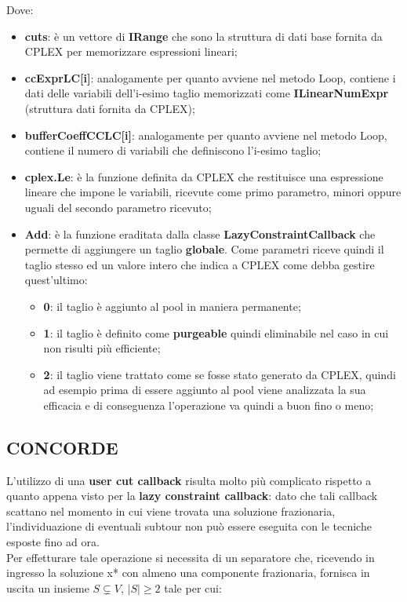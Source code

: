 \documentclass[11pt]{article}
\begin{document}
Dove:

\begin{itemize}
    \item \textbf{cuts}: è un vettore di \textbf{IRange} che sono la struttura di dati base fornita da CPLEX per memorizzare espressioni lineari;
    \item \textbf{ccExprLC[i]}: analogamente per quanto avviene nel metodo Loop, contiene i dati delle variabili dell'i-esimo taglio memorizzati come \textbf{ILinearNumExpr} (struttura dati fornita da CPLEX);
    \item \textbf{bufferCoeffCCLC[i]}: analogamente per quanto avviene nel metodo Loop, contiene il numero di variabili che definiscono l'i-esimo taglio;
    \item \textbf{cplex.Le}: è la funzione definita da CPLEX che restituisce una espressione lineare che impone le variabili, ricevute come primo parametro, minori oppure uguali del secondo parametro ricevuto;
    \item \textbf{Add}: è la funzione eraditata dalla classe \textbf{LazyConstraintCallback} che permette di aggiungere un taglio \textbf{globale}. Come parametri riceve quindi il taglio stesso ed un valore intero che indica a CPLEX come debba gestire quest'ultimo:
    \begin{itemize}
        \item \textbf{0}: il taglio è aggiunto al pool in maniera permanente;
        \item \textbf{1}: il taglio è definito come \textbf{purgeable} quindi eliminabile nel caso in cui non risulti più efficiente;
        \item \textbf{2}: il taglio viene trattato come se fosse stato generato da CPLEX, quindi ad esempio prima di essere aggiunto al pool viene analizzata la sua efficacia e di conseguenza l'operazione va quindi a buon fino o meno;
    \end{itemize}

\end{itemize}

\subsection*{CONCORDE}
\label{sec:ConcordeS}

L'utilizzo di una \textbf{user cut callback} risulta molto più complicato rispetto a quanto appena visto per la \textbf{lazy constraint callback}: dato che tali callback scattano nel momento in cui viene trovata una soluzione frazionaria, l'individuazione di eventuali subtour non può essere eseguita con le tecniche esposte fino ad ora.\\
Per effetturare tale operazione si necessita di un separatore che, ricevendo in ingresso la soluzione x* con almeno una componente frazionaria, fornisca in uscita un insieme $S\subsetneq{V}$, $|S|\geq{2}$ tale per cui:
\end{document}
